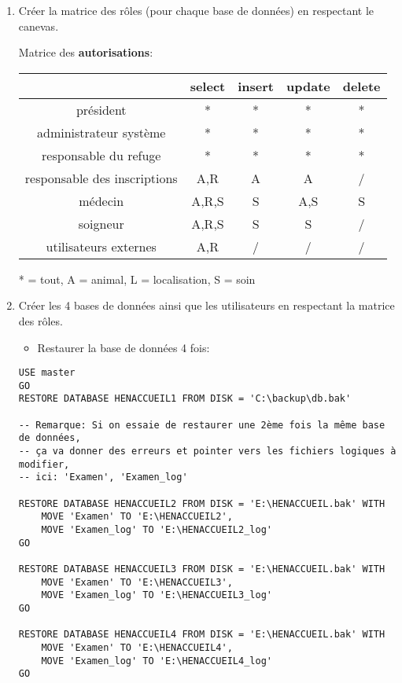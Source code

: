 \documentclass[a4paper]{article}
\begin{document}
\begin{itemize}
\begin{enumerate}
\item Créer la matrice des rôles (pour chaque base de données) en respectant le canevas.
\begin{example}
    Matrice des \textbf{autorisations}:
    \begin{center}
        \begin{tabular}{|c|c|c|c|c|} \hline
            & select & insert & update & delete \\ \hline
            président & * & * & * & * \\
            administrateur système & * & * & * & * \\
            responsable du refuge & * & * & * & * \\
            responsable des inscriptions & A,R & A & A & / \\
            médecin & A,R,S & S & A,S & S \\
            soigneur & A,R,S & S & S & / \\
            utilisateurs externes & A,R & / & / & / \\ \hline
        \end{tabular}
    \end{center}
    * = tout, A = animal, L = localisation, S = soin
\end{example}


\item Créer les 4 bases de données ainsi que les utilisateurs en respectant la matrice des rôles.
\begin{example}

\begin{itemize} \item Restaurer la base de données 4 fois: \end{itemize}
\begin{verbatim}
USE master
GO
RESTORE DATABASE HENACCUEIL1 FROM DISK = 'C:\backup\db.bak'

-- Remarque: Si on essaie de restaurer une 2ème fois la même base de données,
-- ça va donner des erreurs et pointer vers les fichiers logiques à modifier,
-- ici: 'Examen', 'Examen_log'

RESTORE DATABASE HENACCUEIL2 FROM DISK = 'E:\HENACCUEIL.bak' WITH
    MOVE 'Examen' TO 'E:\HENACCUEIL2',
    MOVE 'Examen_log' TO 'E:\HENACCUEIL2_log'
GO

RESTORE DATABASE HENACCUEIL3 FROM DISK = 'E:\HENACCUEIL.bak' WITH
    MOVE 'Examen' TO 'E:\HENACCUEIL3',
    MOVE 'Examen_log' TO 'E:\HENACCUEIL3_log'
GO

RESTORE DATABASE HENACCUEIL4 FROM DISK = 'E:\HENACCUEIL.bak' WITH
    MOVE 'Examen' TO 'E:\HENACCUEIL4',
    MOVE 'Examen_log' TO 'E:\HENACCUEIL4_log'
GO
\end{verbatim}


\end{example}
\end{enumerate}
\end{itemize}
\end{document}
